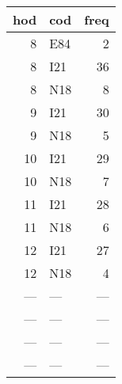 \begin{tabular}{rlr}
  \toprule
 hod & cod & freq \\ 
  \midrule
    8 & E84 &   2 \\ 
    8 & I21 &  36 \\ 
    8 & N18 &   8 \\ 
    9 & I21 &  30 \\ 
    9 & N18 &   5 \\ 
   10 & I21 &  29 \\ 
   10 & N18 &   7 \\ 
   11 & I21 &  28 \\ 
   11 & N18 &   6 \\ 
   12 & I21 &  27 \\ 
   12 & N18 &   4 \\ 
  --- & --- & --- \\ 
  --- & --- & --- \\ 
  --- & --- & --- \\ 
  --- & --- & --- \\ 
   \bottomrule
\end{tabular}
